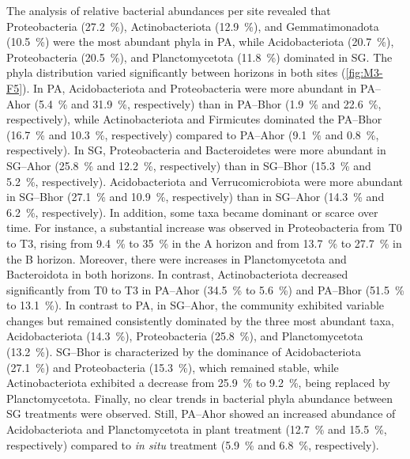 The analysis of relative bacterial abundances per site revealed that Proteobacteria (\SI{27.2}{\percent}), Actinobacteriota (\SI{12.9}{\percent}), and Gemmatimonadota (\SI{10.5}{\percent}) were the most abundant phyla in PA, while Acidobacteriota (\SI{20.7}{\percent}), Proteobacteria (\SI{20.5}{\percent}), and Planctomycetota (\SI{11.8}{\percent}) dominated in SG. The phyla distribution varied significantly between horizons in both sites (\ref{fig:M3-F5}). In PA, Acidobacteriota and Proteobacteria were more abundant in PA--Ahor (\SI{5.4}{\percent} and \SI{31.9}{\percent}, respectively) than in PA--Bhor (\SI{1.9}{\percent} and \SI{22.6}{\percent}, respectively), while Actinobacteriota and Firmicutes dominated the PA--Bhor (\SI{16.7}{\percent} and \SI{10.3}{\percent}, respectively) compared to PA--Ahor (\SI{9.1}{\percent} and \SI{0.8}{\percent}, respectively). In SG, Proteobacteria and Bacteroidetes were more abundant in SG--Ahor (\SI{25.8}{\percent} and \SI{12.2}{\percent}, respectively) than in SG--Bhor (\SI{15.3}{\percent} and \SI{5.2}{\percent}, respectively). Acidobacteriota and Verrucomicrobiota were more abundant in SG--Bhor (\SI{27.1}{\percent} and \SI{10.9}{\percent}, respectively) than in SG--Ahor (\SI{14.3}{\percent} and \SI{6.2}{\percent}, respectively). In addition, some taxa became dominant or scarce over time. For instance, a substantial increase was observed in Proteobacteria from T0 to T3, rising from \SI{9.4}{\percent} to \SI{35}{\percent} in the A horizon and from \SI{13.7}{\percent} to \SI{27.7}{\percent} in the B horizon. Moreover, there were increases in Planctomycetota and Bacteroidota in both horizons. In contrast, Actinobacteriota decreased significantly from T0 to T3 in PA--Ahor (\SI{34.5}{\percent} to \SI{5.6}{\percent}) and PA--Bhor (\SI{51.5}{\percent} to \SI{13.1}{\percent}). In contrast to PA, in SG--Ahor, the community exhibited variable changes but remained consistently dominated by the three most abundant taxa, Acidobacteriota (\SI{14.3}{\percent}), Proteobacteria (\SI{25.8}{\percent}), and Planctomycetota (\SI{13.2}{\percent}). SG--Bhor is characterized by the dominance of Acidobacteriota (\SI{27.1}{\percent}) and Proteobacteria (\SI{15.3}{\percent}), which remained stable, while Actinobacteriota exhibited a decrease from \SI{25.9}{\percent} to \SI{9.2}{\percent}, being replaced by Planctomycetota. Finally, no clear trends in bacterial phyla abundance between SG treatments were observed. Still, PA--Ahor showed an increased abundance of Acidobacteriota and Planctomycetota in plant treatment (\SI{12.7}{\percent} and \SI{15.5}{\percent}, respectively) compared to \textit{in situ} treatment (\SI{5.9}{\percent} and \SI{6.8}{\percent}, respectively).

